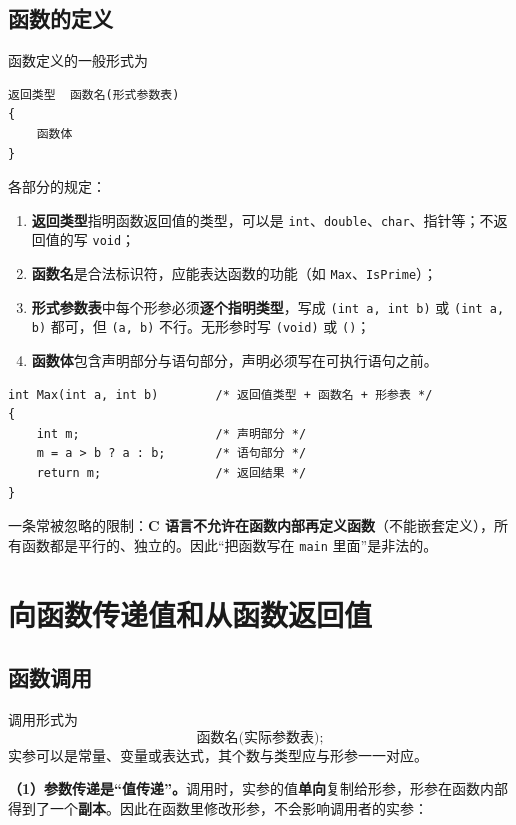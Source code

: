 \subsection{函数的定义}

函数定义的一般形式为

\begin{lstlisting}
返回类型  函数名(形式参数表)
{
    函数体
}
\end{lstlisting}

各部分的规定：

\begin{enumerate}
  \item \textbf{返回类型}指明函数返回值的类型，可以是 \texttt{int}、\texttt{double}、\texttt{char}、指针等；不返回值的写 \texttt{void}；
  \item \textbf{函数名}是合法标识符，应能表达函数的功能（如 \texttt{Max}、\texttt{IsPrime}）；
  \item \textbf{形式参数表}中每个形参必须\textbf{逐个指明类型}，写成 \texttt{(int a, int b)} 或 \texttt{(int a, b)} 都可，但 \texttt{(a, b)} 不行。无形参时写 \texttt{(void)} 或 \texttt{()}；
  \item \textbf{函数体}包含声明部分与语句部分，声明必须写在可执行语句之前。
\end{enumerate}

\begin{lstlisting}
int Max(int a, int b)        /* 返回值类型 + 函数名 + 形参表 */
{
    int m;                   /* 声明部分 */
    m = a > b ? a : b;       /* 语句部分 */
    return m;                /* 返回结果 */
}
\end{lstlisting}

一条常被忽略的限制：\textbf{C 语言不允许在函数内部再定义函数}（不能嵌套定义），所有函数都是平行的、独立的。因此“把函数写在 \texttt{main} 里面”是非法的。

\section{向函数传递值和从函数返回值}

\subsection{函数调用}

调用形式为
\[
\text{函数名(实际参数表);}
\]
实参可以是常量、变量或表达式，其个数与类型应与形参一一对应。

\textbf{（1）参数传递是“值传递”。}调用时，实参的值\textbf{单向}复制给形参，形参在函数内部得到了一个\textbf{副本}。因此在函数里修改形参，不会影响调用者的实参：

